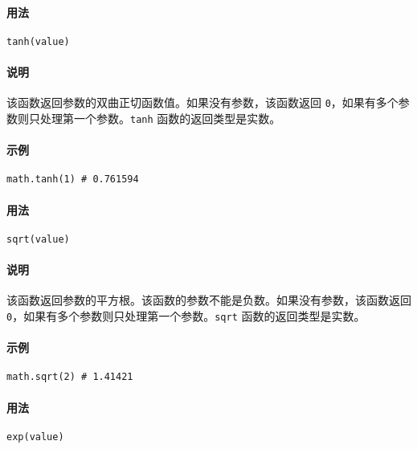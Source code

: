 \paragraph{用法}
\begin{lstlisting}[language=berry, numbers=none]
tanh(value)
\end{lstlisting}

\paragraph{说明}
该函数返回参数的双曲正切函数值。如果没有参数，该函数返回 \texttt{0}，如果有多个参数则只处理第一个参数。\texttt{tanh} 函数的返回类型是实数。

\paragraph{示例}
\begin{lstlisting}[language=berry, numbers=none]
math.tanh(1) # 0.761594
\end{lstlisting}


\paragraph{用法}
\begin{lstlisting}[language=berry, numbers=none]
sqrt(value)
\end{lstlisting}

\paragraph{说明}
该函数返回参数的平方根。该函数的参数不能是负数。如果没有参数，该函数返回 \texttt{0}，如果有多个参数则只处理第一个参数。\texttt{sqrt} 函数的返回类型是实数。

\paragraph{示例}
\begin{lstlisting}[language=berry, numbers=none]
math.sqrt(2) # 1.41421
\end{lstlisting}


\paragraph{用法}
\begin{lstlisting}[language=berry, numbers=none]
exp(value)
\end{lstlisting}

